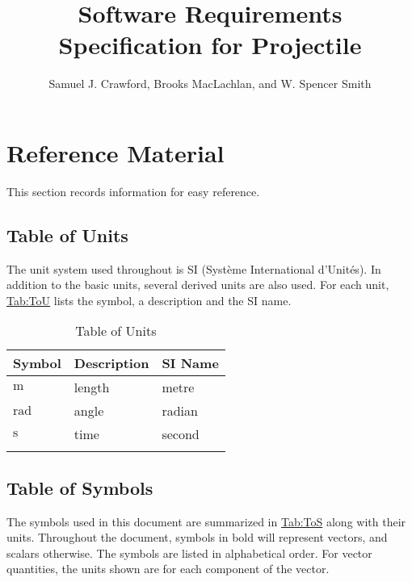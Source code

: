 \documentclass[12pt]{article}
\title{Software Requirements Specification for Projectile}
\author{Samuel J. Crawford, Brooks MacLachlan, and W. Spencer Smith}
\begin{document}
\maketitle
\tableofcontents
\newpage
\section{Reference Material}
\label{Sec:RefMat}
This section records information for easy reference.

\subsection{Table of Units}
\label{Sec:ToU}
The unit system used throughout is SI (Système International d'Unités). In addition to the basic units, several derived units are also used. For each unit, \hyperref[Table:ToU]{Tab:ToU} lists the symbol, a description and the SI name.

\begin{longtable}{l l l}
\toprule
\textbf{Symbol} & \textbf{Description} & \textbf{SI Name}
\\
\midrule
\endhead
${\text{m}}$ & length & metre
\\
${\text{rad}}$ & angle & radian
\\
${\text{s}}$ & time & second
\\
\bottomrule
\caption{Table of Units}
\label{Table:ToU}
\end{longtable}
\subsection{Table of Symbols}
\label{Sec:ToS}
The symbols used in this document are summarized in \hyperref[Table:ToS]{Tab:ToS} along with their units. Throughout the document, symbols in bold will represent vectors, and scalars otherwise. The symbols are listed in alphabetical order. For vector quantities, the units shown are for each component of the vector.
\end{document}
